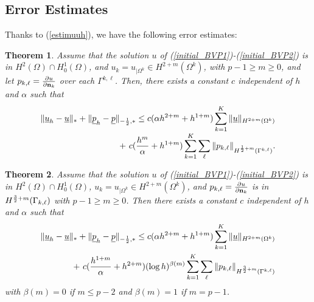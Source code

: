 \documentclass[final]{siamltex}
\newtheorem{theo}{Theorem}
\begin{document}
\subsection{Error Estimates}
Thanks to (\ref{estimuuh}), we have the following error estimates:
\begin{theo}
\label{error-estimate}
Assume that the solution $u$ of
(\ref{initial_BVP1})-(\ref{initial_BVP2}) is in $H^2(\Omega)\cap H^1_0(\Omega)$, and $u_k=u_{|\Omega^k}\in
H^{2+m}(\Omega^k)$, with
$p-1\ge m \ge 0$,
and let
$p_{k,\ell}=\frac{\partial u}{\partial {\bf n}_k}$
over each $\Gamma^{k,\ell}$.
Then, there exists a constant $c$ independent of $h$ and $\alpha$
such that
\begin{eqnarray}
\| {{\underline u}}_h -{{\underline u}}\|_* + \| {{\underline p}}_h - {{\underline p}} \|_{-{1 \over 2},*}
\le c(\alpha h^{2+m}+h^{1+m} )
\sum_{k=1}^K \| {{\underline u}}\|_{H^{2+m}(\Omega^k)} \nonumber\\[-1mm]
+ \ c ({h^m\over \alpha} + h^{1+m})\sum_{k=1}^K \sum_{\ell}\| 
p_{k,\ell} \|_{H^{{1
\over 2}+m}(\Gamma^{k,\ell})}.
\nonumber
\end{eqnarray}
\end{theo}
\begin{theo}
\label{error-estimate2}
Assume that the solution $u$ of
(\ref{initial_BVP1})-(\ref{initial_BVP2}) is in $H^2(\Omega)\cap H^1_0(\Omega)$, $u_k=u_{|\Omega^k}\in
H^{2+m}(\Omega^k)$,
and
$p_{k,\ell}=\frac{\partial u}{\partial {\bf n}_k}$
is in $H^{{3 \over 2}+m}(\Gamma_{k,\ell})$ with $p-1\ge m \ge 0$.
Then there exists a constant $c$ independent of $h$ and $\alpha$
such that
\begin{eqnarray}
\| {{\underline u}}_h -{{\underline u}}\|_* + \| {{\underline p}}_h - {{\underline p}}\|_{-{1 \over 2},*}
\le c(\alpha h^{2+m}+h^{1+m} )
\sum_{k=1}^K \| {{\underline u}}\|_{H^{2+m}(\Omega^k)} \nonumber\\
+ \ c ({h^{1+m}\over \alpha} + h^{2+m}) (\log h)^{\beta(m)} 
\sum_{k=1}^K \sum_{\ell}\|
p_{k,\ell}
\|_{H^{{3
\over 2}+m}(\Gamma^{k,\ell})}
\nonumber
\end{eqnarray}
with $\beta(m)=0$ if
$m\le p-2$ and $\beta(m)=1$ if $m=p-1$.
\end{theo}
\end{document}
